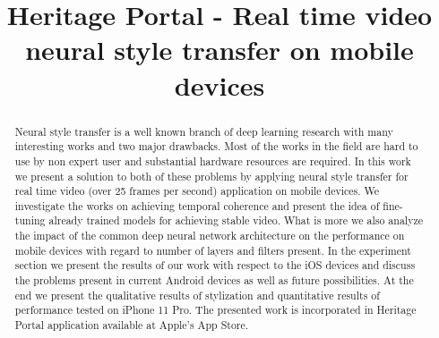 \documentclass[a4paper,conference]{IEEEtran}
\begin{document}
%
\title{Heritage Portal - Real time video neural style transfer on mobile devices}


\author{
\and
{}
}



\maketitle

\begin{abstract}
Neural style transfer is a well known branch of deep learning research with many interesting works and two major drawbacks. Most of the works in the field are hard to use by non expert user and substantial hardware resources are required. In this work we present a solution to both of these problems by applying neural style transfer for real time video (over 25 frames per second) application on mobile devices. We investigate the works on achieving temporal coherence and present the idea of fine-tuning already trained models for achieving stable video. What is more we also analyze the impact of the common deep neural network  architecture on the performance on mobile devices with regard to number of layers and filters present. In the experiment section we present the results of our work with respect to the iOS devices and discuss the problems present in current Android devices as well as future possibilities. At the end we present the qualitative results of stylization and quantitative results of performance tested on iPhone 11 Pro. The presented work is incorporated in Heritage Portal application available at Apple's App Store.
\end{abstract}
\end{document}
